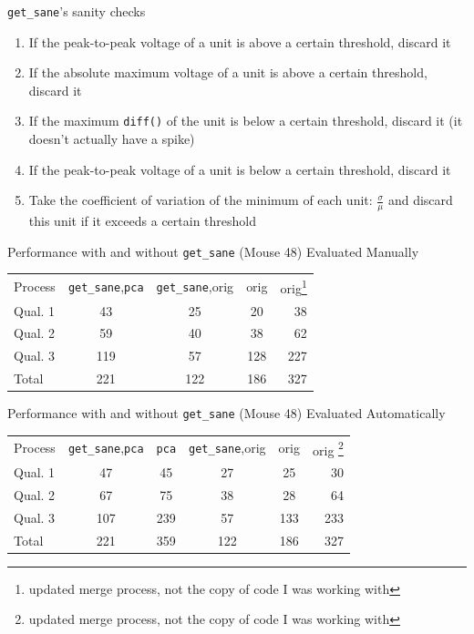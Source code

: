 \documentclass{beamer}
\begin{document}
    \begin{frame}{\texttt{get\_sane}'s sanity checks}
        \begin{enumerate}
            \pause
            \item If the peak-to-peak voltage of a unit is above a certain
threshold, discard it
            \pause
            \item If the absolute maximum voltage of a unit is above a certain
threshold, discard it 
            \pause
            \item If the maximum \texttt{diff()} of the unit is below a certain
threshold, discard it (it doesn't actually have a spike)
            \pause
            \item If the peak-to-peak voltage of a unit is below a certain
threshold, discard it
            \pause
            \item Take the coefficient of variation of the minimum of each unit:
\ensuremath{\frac{\sigma}{\mu}} and discard this unit if it exceeds a certain threshold
         \end{enumerate}
    \end{frame}

    \begin{frame}{Performance with and without \texttt{get\_sane} (Mouse 48)
Evaluated Manually}
        \begin{tabular}{l c c c r}
        \pause
        Process&\texttt{get\_sane},\texttt{pca}&\texttt{get\_sane},orig&orig&orig\footnote{updated
merge process, not the copy of code I was working with}\\
        \pause
        Qual. 1&43&25&20&38\\
        Qual. 2&59&40&38&62\\
        Qual. 3&119&57&128&227\\
        Total&221&122&186&327
        \end{tabular}
    \end{frame}

    \begin{frame}{Performance with and without \texttt{get\_sane} (Mouse 48)
Evaluated Automatically}
        \begin{tabular}{l c c c c r}
        \pause
        Process&\texttt{get\_sane},\texttt{pca}&\texttt{pca}&\texttt{get\_sane},orig&orig&orig
\footnote{updated
merge process, not the copy of code I was working with}\\
        \pause
        Qual. 1&47&45&27&25&30\\
        Qual. 2&67&75&38&28&64\\
        Qual. 3&107&239&57&133&233\\
        Total&221&359&122&186&327\\
        \end{tabular}
    \end{frame} 
\end{document}
